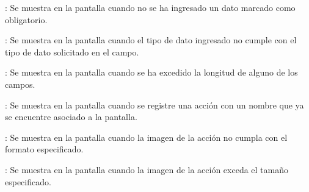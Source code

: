 \begin{Citemize}
	\item {}: Se muestra en la pantalla  cuando no se ha ingresado un dato marcado como obligatorio.
	\item {}: Se muestra en la pantalla  cuando el tipo de dato ingresado no cumple con el tipo de dato solicitado en el campo.
	\item {}: Se muestra en la pantalla  cuando se ha excedido la longitud de alguno de los campos.
	\item {}: Se muestra en la pantalla  cuando se registre una acción con un nombre que ya se encuentre asociado a la pantalla.
	\item {}: Se muestra en la pantalla  cuando la imagen de la acción no cumpla con el formato especificado.
	\item {}: Se muestra en la pantalla  cuando la imagen de la acción exceda el tamaño especificado.
\end{Citemize}
